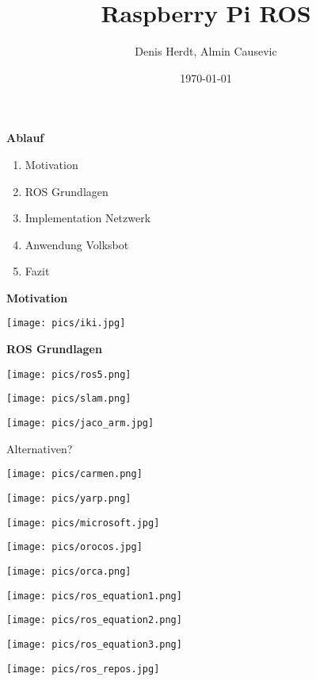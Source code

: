 \documentclass{beamer}
\title[Raspberry Pi ROS]{Raspberry Pi ROS}
\author{Denis Herdt, Almin Causevic}
\institute[I_HS Wgt-Rav]{Angewandte Informatik HS Weingarten-Ravensburg}
\date{\today}
\begin{document}
\frame{\titlepage}

\begin{frame}
{\bf Ablauf}
\begin{enumerate}
\item Motivation
\item ROS Grundlagen
\item Implementation Netzwerk
\item Anwendung Volksbot
\item Fazit
\end{enumerate}
\end{frame}

\begin{frame}
{\bf Motivation}
\centerline{\texttt{[image: pics/iki.jpg]}}
\end{frame}

\begin{frame}
{\bf ROS Grundlagen}
\centerline{\texttt{[image: pics/ros5.png]}}
\end{frame}

\begin{frame}
\centerline{\texttt{[image: pics/slam.png]}}
\end{frame}

\begin{frame}
\centerline{\texttt{[image: pics/jaco\_arm.jpg]}}
\end{frame}

\begin{frame}
\huge Alternativen? \\
\parbox{5cm}{\texttt{[image: pics/carmen.png]}}
\parbox{5cm}{\texttt{[image: pics/yarp.png]}}
\parbox{5cm}{\texttt{[image: pics/microsoft.jpg]}}
\hspace{5cm}
\parbox{5cm}{\texttt{[image: pics/orocos.jpg]}}
\parbox{5cm}{\texttt{[image: pics/orca.png]}}
\end{frame}

\begin{frame}
\centerline{\texttt{[image: pics/ros\_equation1.png]}}
\centerline{\texttt{[image: pics/ros\_equation2.png]}}
\centerline{\texttt{[image: pics/ros\_equation3.png]}}
\end{frame}

\begin{frame}
\centerline{\texttt{[image: pics/ros\_repos.jpg]}}
\end{frame}
\end{document}
